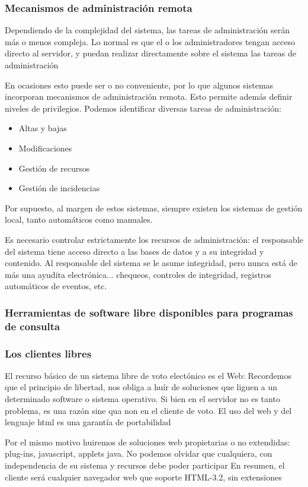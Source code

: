 \subsubsection*{Mecanismos de administración remota}
Dependiendo de la complejidad del sistema, las tareas de administración serán más o menos compleja. Lo normal es que el o los administradores tengan acceso directo al servidor, y puedan realizar directamente sobre el sistema las tareas de administración

En ocasiones esto puede ser o no conveniente, por lo que algunos sistemas incorporan mecanismos de administración remota. Esto permite además definir niveles de privilegios. Podemos identificar diversas tareas de administración:

\begin{itemize}
\item Altas y bajas
\item Modificaciones
\item Gestión de recursos
\item Gestión de incidencias
\end{itemize}

Por supuesto, al margen de estos sistemas, siempre existen los sistemas de gestión local, tanto automáticos como manuales.

Es necesario controlar estrictamente los recursos de administración: el responsable del sistema tiene acceso directo a las bases de datos y a su integridad y contenido. Al responsable del sistema se le asume integridad, pero nunca está de más una ayudita electrónica... chequeos, controles de integridad, registros automáticos de eventos, etc.


\subsubsection{Herramientas de software libre disponibles para programas de consulta}
\subsubsection*{Los clientes libres}
El recurso básico de un sistema libre de voto electónico es el Web: Recordemos que el principio de libertad, nos obliga a huír de soluciones que liguen a un determinado software o sistema operativo. Si bien en el servidor no es tanto problema, es una razón sine qua non en el cliente de voto. El uso del web y del lenguaje html es una garantía de portabilidad

Por el mismo motivo huiremos de soluciones web propietarias o no extendidas: plug-ins, javascript, applets java. No podemos olvidar que cualquiera, con independencia de su sistema y recursos debe poder participar En resumen, el cliente será cualquier navegador web que soporte HTML-3.2, sin extensiones

